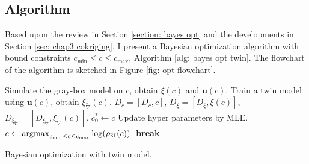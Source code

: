 \subsection{Algorithm}
\label{sec: chap3 algo}
Based upon the review in Section \ref{section: bayes opt} and the
developments in Section \ref{sec: chap3 cokriging}, I present a Bayesian optimization 
algorithm with bound constraints $c_{\min}\le c\le c_{\max}$, Algorithm \ref{alg: bayes opt twin}. 
The flowchart of the algorithm is sketched in Figure \ref{fig: opt flowchart}.\\

\begin{algorithm}[htbp]
\begin{algorithmic}[1]
    \STATE Simulate the gray-box model on $c$, obtain $\xi(c)$ and $\boldsymbol{u}(c)$.
    \STATE Train a twin model using $\boldsymbol{u}(c)$, obtain $\xi_{\tilde{\nabla}}(c)$.
    \STATE $D_c = [D_c, c]$, $D_{\xi} = [D_\xi, \xi(c)]$, $D_{\xi_{\tilde{\nabla}}} = 
           [D_{\xi_{\tilde{\nabla}}}, \xi_{\tilde{\nabla}}(c)]$.
        \STATE $c^*_0 \leftarrow c$
    \ENDIF
    \STATE Update hyper parameters by MLE.
    \STATE $c \leftarrow \operatorname*{\arg\!\max}_{c_{\min}\le c\le c_{\max}} \log(\rho_{\texttt{EI}}(c))$.
        \STATE \textbf{break}
    \ENDIF
\ENDFOR
{}
\end{algorithmic}
\caption{Bayesian optimization with twin model.}
\label{alg: bayes opt twin}
\end{algorithm}

